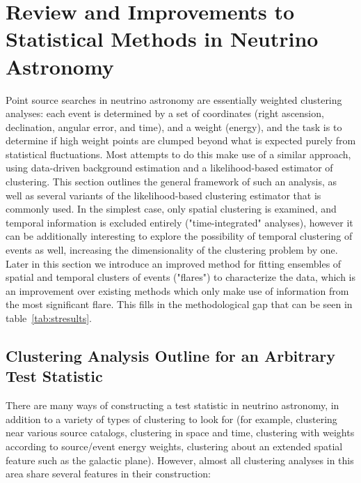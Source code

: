 \chapter{Review and Improvements to Statistical Methods in Neutrino Astronomy}\label{chapter:methods}
Point source searches in neutrino astronomy are essentially weighted clustering analyses: each event is determined by a set of coordinates (right ascension, declination, angular error, and time), and a weight (energy), and the task is to determine if high weight points are clumped beyond what is expected purely from statistical fluctuations. Most attempts to do this make use of a similar approach, using data-driven background estimation and a likelihood-based estimator of clustering. This section outlines the general framework of such an analysis, as well as several variants of the likelihood-based clustering estimator that is commonly used. \color{red}In the simplest case, only spatial clustering is examined, and temporal information is excluded entirely ("time-integrated" analyses), however it can be additionally interesting to explore the possibility of temporal clustering of events as well, increasing the dimensionality of the clustering problem by one. Later in this section we introduce an improved method for fitting ensembles of spatial and temporal clusters of events ("flares") to characterize the data, which is an improvement over existing methods which only make use of information from the most significant flare. This fills in the methodological gap that can be seen in table~\ref{tab:stresults}. \color{black}

\section{Clustering Analysis Outline for an Arbitrary Test Statistic}
There are many ways of constructing a test statistic in neutrino astronomy, in addition to a variety of types of clustering to look for (for example, clustering near various source catalogs, clustering in space and time, clustering with weights according to source/event energy weights, clustering about an extended spatial feature such as the galactic plane). However, almost all clustering analyses in this area share several features in their construction:

